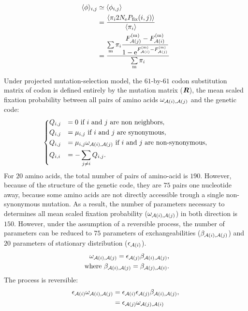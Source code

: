 \begin{align}
    \langle \phi \rangle_{{i}, {j}} & \simeq \langle \phi_{{i}, {j}} \rangle \\
    & = \dfrac{ \langle \pi_{{i}} 2N_{\textrm{e}} P_{\mathrm{fix}}({i}, {j}) \rangle }{ \langle \pi_{{i}} \rangle } \\
    & = \dfrac{ \sum\limits_{\text{m}}  \pi_{{i}}\dfrac{F_{\mathcal{A}({j})}^{(\text{m})} - F_{\mathcal{A}({i})}^{(\text{m})}}{1 - \mathrm{e}^{F_{\mathcal{A}({i})}^{(\text{m})} - F_{\mathcal{A}({j})}^{(\text{m})}}} }{ \sum\limits_{\text{m}} \pi_{{i}} }
\end{align}

Under projected mutation-selection model, the $61$-by-$61$ \gls{codon} \gls{substitution} matrix of \gls{codon} is defined entirely by the mutation matrix ($\bm{R}$), the mean scaled fixation probability between all pairs of amino acids $\omega_{\mathcal{A}({i}), \mathcal{A}({j})}$ and the genetic code:
\begin{equation}
    \begin{dcases}
        Q_{{i}, {j}} & = 0 \text{ if ${i}$ and ${j}$ are non neighbors}, \\
        Q_{{i}, {j}} & = \mu_{{i}, {j}} \text{ if ${i}$ and ${j}$ are synonymous}, \\
        Q_{{i}, {j}} & = \mu_{{i}, {j}} \omega_{\mathcal{A}({i}), \mathcal{A}({j})} \text{ if ${i}$ and ${j}$ are non-synonymous}, \\
        Q_{{i}, {i}} & = - \sum\limits_{{j} \neq {i}} Q_{{i}, {j}}.
    \end{dcases}
    \label{eq:codon-mean-field}
\end{equation}
For $20$ amino acids, the total number of pairs of amino-acid is $190$.
However, because of the structure of the genetic code, they are $75$ pairs one nucleotide away, because some amino acids are not directly accessible trough a single non-synonymous mutation.
As a result, the number of parameters necessary to determines all mean scaled fixation probability ($\omega_{\mathcal{A}({i}), \mathcal{A}({j})}$) in both direction is $150$.
However, under the assumption of a reversible process, the number of parameters can be reduced to $75$ parameters of exchangeabilities ($\beta_{\mathcal{A}({i}), \mathcal{A}({j})}$) and $20$ parameters of stationary distribution ($\epsilon_{\mathcal{A}({i})}$).
\begin{align}
    \omega_{\mathcal{A}({i}), \mathcal{A}({j})} = \epsilon_{\mathcal{A}({j})} \beta_{\mathcal{A}({i}), \mathcal{A}({j})}, \\
    \text{ where } \beta_{\mathcal{A}({i}), \mathcal{A}({j})} = \beta_{\mathcal{A}({j}), \mathcal{A}({i})}.
\end{align}
The process is reversible:
\begin{align}
    \epsilon_{\mathcal{A}({i})} \omega_{\mathcal{A}({i}), \mathcal{A}({j})} & = \epsilon_{\mathcal{A}({i})} \epsilon_{\mathcal{A}({j})} \beta_{\mathcal{A}({i}), \mathcal{A}({j})}, \\
    & = \epsilon_{\mathcal{A}({j})} \omega_{\mathcal{A}({j}), \mathcal{A}({i})}
\end{align}

